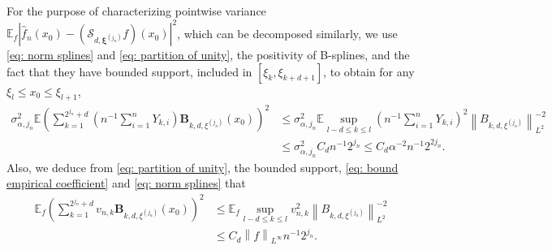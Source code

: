 \documentclass[preprint]{imsart}
\newcommand\norm[1]{\left\lVert#1\right\rVert}
\numberwithin{equation}{section}
\begin{document}
\begin{appendix}
For the purpose of characterizing pointwise variance $\mathbb{E}_f|\hat{f}_n(x_0) - (\mathcal{S}_{d,\mathbf{\xi}^{(j_n)}}f)(x_0)|^2$, which can be decomposed similarly, we use \eqref{eq: norm splines} and \eqref{eq: partition of unity}, the positivity of B-splines, and the fact that they have bounded support, included in $[\xi_k, \xi_{k+d+1}]$, to obtain for any $\xi_l \leq x_0\leq \xi_{l+1}$,
\begin{align*}
    \sigma_{\alpha,j_n}^2\mathbb{E}\left(\sum_{k=1}^{2^{j_n}+d} \left(n^{-1}\sum_{i=1}^n Y_{k,i}\right) \mathbf{B}_{k,d,\xi^{(j_n)}}(x_0) \right)^2
    &\leq\sigma_{\alpha,j_n}^2 \mathbb{E} \sup_{l-d\leq k\leq l} \left(n^{-1}\sum_{i=1}^n Y_{k,i}\right)^2\norm{B_{k,d,\xi^{(j_n)}}}_{L^2}^{-2}\\
    &\leq \sigma_{\alpha,j_n}^2C_d n^{-1} 2^{j_n} \leq C_d \alpha^{-2} n^{-1} 2^{2j_n}. 
\end{align*}
Also, we deduce from \eqref{eq: partition of unity}, the bounded support, \eqref{eq: bound empirical coefficient} and \eqref{eq: norm splines} that
\begin{align*}
    \mathbb{E}_f\left(\sum_{k=1}^{2^{j_n}+d} v_{n,k}\mathbf{B}_{k,d,\xi^{(j_n)}}(x_0)\right)^2
    &\leq \mathbb{E}_f \sup_{l-d\leq k\leq l} v_{n,k}^2\norm{B_{k,d,\xi^{(j_n)}}}_{L^2}^{-2}\\
    &\leq C_d \norm{f}_{L^\infty} n^{-1} 2^{j_n}. 
\end{align*}



\end{appendix}
\end{document}
